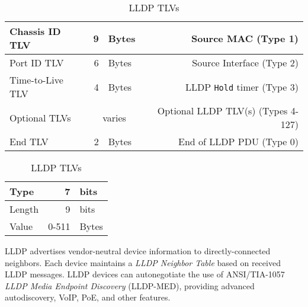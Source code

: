 \documentclass[12pt]{article}
\newcommand{\mc}[3]{\multicolumn{#1}{#2}{#3}}
\begin{document}
	\begin{table}[H]
	\begin{minipage}{.75\linewidth}
	\centering
	\caption{IEEE 802.1AB LLDP PDU Format \label{tab:802.1AB}}
	\begin{tabular}{| l | r @{ } l | r |}\hline
	Chassis ID TLV	& 9	& Bytes		& Source MAC (Type 1)\\\hline
	Port ID TLV		& 6	& Bytes		& Source Interface (Type 2)\\\hline
	Time-to-Live TLV	& 4	& Bytes		& LLDP \texttt{Hold} timer (Type 3)\\\hline
	Optional TLVs	& \mc{2}{c|}{varies}	& Optional LLDP TLV(s) (Types 4-127)\\\hline
	End TLV		& 2	& Bytes		& End of LLDP PDU (Type 0)\\\hline
	\end{tabular}\end{minipage}\hfill
	\begin{minipage}{.24\linewidth}
	\centering
	\caption{LLDP TLVs \label{tab:LLDP TLV}}
	\begin{tabular}{| l | r @{ } l |}\hline
	Type		& 7		& bits\\\hline
	Length	& 9		& bits\\\hline
	Value		& 0-511	& Bytes\\\hline
	\end{tabular}\end{minipage}\end{table}
	LLDP advertises vendor-neutral device information to directly-connected neighbors. Each device maintains a \textit{LLDP Neighbor Table} based on received LLDP messages. LLDP devices can autonegotiate the use of ANSI/TIA-1057 \textit{LLDP Media Endpoint Discovery} (LLDP-MED), providing advanced autodiscovery, VoIP, PoE, and other features.


\end{document}

